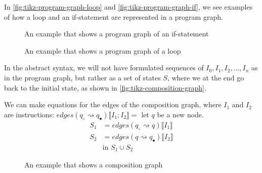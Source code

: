 In \autoref{fig:tikz-program-graph-loop} and \autoref{fig:tikz-program-graph-if}, we see examples of how a loop and an if-statement are represented in a program graph.

\begin{figure}[htb!]
    \center
    
    \caption{An example that shows a program graph of an if-statement}
    \label{fig:tikz-program-graph-if}
\end{figure}

\begin{figure}[htb!]
    \center
    
    \caption{An example that shows a program graph of a loop}
    \label{fig:tikz-program-graph-loop}
\end{figure}

In the abstract syntax, we will not have formulated sequences of $I_0, I_1, I_2, \dots, I_n$ as in the program graph, but rather as a set of states $S$, where we at the end go back to the initial state, as shown in \autoref{fig:tikz-composition-graph}.

We can make equations for the edges of the composition graph, where $I_1$ and $I_2$ are instructions:
$edges(q_{\circ} \rightsquigarrow q_{\bullet})\llbracket I_1 ; I_2 \rrbracket = $ let $q$ be a new node.
\begin{align}
    S_1 &= edges(q_{\circ} \rightsquigarrow q)\llbracket I_1 \rrbracket \\
    S_2 &= edges(q \rightsquigarrow q_{\bullet})\llbracket I_2 \rrbracket \\
    &\text{in } S_1 \cup S_2
\end{align}

\begin{figure}
    \center
    
    \caption{An example that shows a composition graph}
    \label{fig:tikz-composition-graph}
\end{figure}
